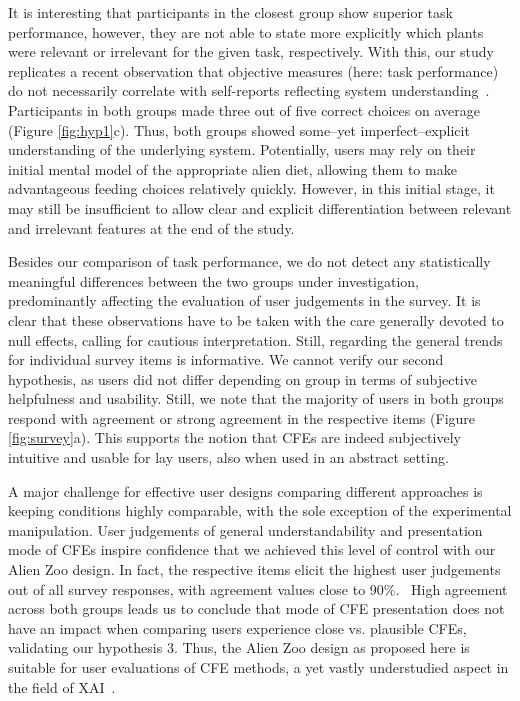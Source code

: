 It is interesting that participants in the closest group show superior task performance, however, they are not able to state more explicitly which plants were relevant or irrelevant for the given task, respectively. 
With this, our study replicates a recent observation that objective measures (here: task performance) do not necessarily correlate with self-reports reflecting system understanding~\citep{van_der_waa_evaluating_2021}.
Participants in both groups made three out of five correct choices on average (Figure \ref{fig:hyp1}c).
Thus, both groups showed some--yet imperfect--explicit understanding of the underlying system.
Potentially, users may rely on their initial mental model of the appropriate alien diet, allowing them to make advantageous feeding choices relatively quickly. However, in this initial stage, it may still be insufficient to allow clear and explicit differentiation between relevant and irrelevant features at the end of the study.

Besides our comparison of task performance, we do not detect any statistically meaningful differences between the two groups under investigation, predominantly affecting the evaluation of user judgements in the survey. 
It is clear that these observations have to be taken with the care generally devoted to null effects, calling for cautious interpretation. 
Still, regarding the general trends for individual survey items is informative.
We cannot verify our second hypothesis, as users did not differ depending on group in terms of subjective helpfulness and usability. 
Still, we note that the majority of users in both groups respond with agreement or strong agreement in the respective items (Figure \ref{fig:survey}a).
This supports the notion that \glspl{CFE} are indeed subjectively intuitive and usable for lay users, also when used in an abstract setting.

A major challenge for effective user designs comparing different approaches is keeping conditions highly comparable, with the sole exception of the experimental manipulation.
User judgements of general understandability and presentation mode of \glspl{CFE} inspire confidence that we achieved this level of control with our Alien Zoo design. 
In fact, the respective items elicit the highest user judgements out of all survey responses, with agreement values close to 90\%.%
~High agreement across both groups leads us to conclude that mode of \gls{CFE} presentation does not have an impact when comparing users experience close vs. plausible \glspl{CFE}, validating our hypothesis 3.
Thus, the Alien Zoo design as proposed here is suitable for user evaluations of \gls{CFE} methods, a yet vastly understudied aspect in the field of \gls{XAI}~\citep{keane_if_2021}.

